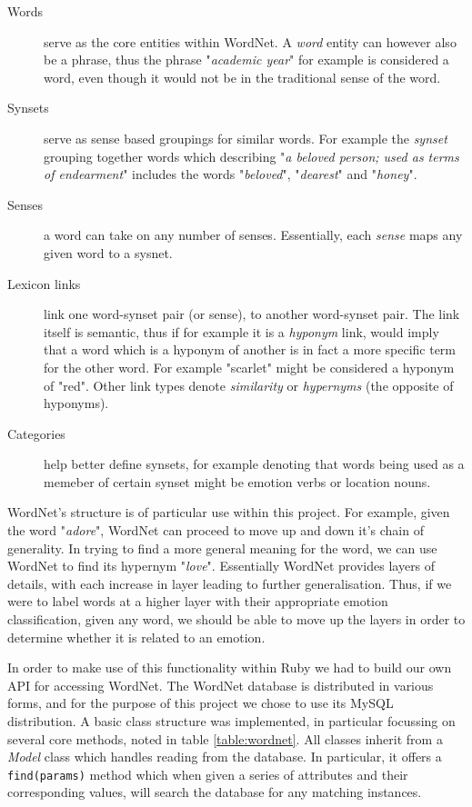 \begin{description}
	\item [Words] serve as the core entities within WordNet. A \emph{word} entity can however also be a phrase, thus the phrase "\emph{academic year}" for example is considered a word, even though it would not be in the traditional sense of the word.
	\item [Synsets] serve as sense based groupings for similar words. For example the \emph{synset} grouping together words which describing "\emph{a beloved person; used as terms of endearment}" includes the words "\emph{beloved}", "\emph{dearest}" and "\emph{honey}".
	\item [Senses] a word can take on any number of senses. Essentially, each \emph{sense} maps any given word to a sysnet. 
	\item [Lexicon links] link one word-synset pair (or sense), to another word-synset pair. The link itself is semantic, thus if for example it is a \emph{hyponym} link, would imply that a word which is a hyponym of another is in fact a more specific term for the other word. For example "scarlet" might be considered a hyponym of "red". Other link types denote \emph{similarity} or \emph{hypernyms} (the opposite of hyponyms).
	\item [Categories] help better define synsets, for example denoting that words being used as a memeber of certain synset might be emotion verbs or location nouns.
\end{description} 

WordNet's structure is of particular use within this project. For example, given the word "\emph{adore}", WordNet can proceed to move up and down it's chain of generality. In trying to find a more general meaning for the word, we can use WordNet to find its hypernym "\emph{love}". Essentially WordNet provides layers of details, with each increase in layer leading to further generalisation. Thus, if we were to label words at a higher layer with their appropriate emotion classification, given any word, we should be able to move up the layers in order to determine whether it is related to an emotion.

In order to make use of this functionality within Ruby we had to build our own API for accessing WordNet. The WordNet database is distributed in various forms, and for the purpose of this project we chose to use its MySQL distribution. A basic class structure was implemented, in particular focussing on several core methods, noted in table \ref{table:wordnet}. All classes inherit from a \emph{Model} class which handles reading from the database. In particular, it offers a \texttt{find(params)} method which when given a series of attributes and their corresponding values, will search the database for any matching instances.

